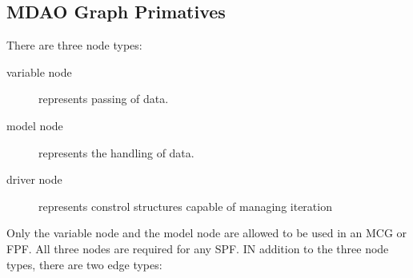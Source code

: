 
\subsection{MDAO Graph Primatives}
There are three node types:  
\begin{description}
\item[variable node] represents passing of data.
\item[model node] represents the handling of data.
\item[driver node] represents constrol structures capable of managing iteration
\end{description}

Only the variable node and the model node are allowed to be used in an MCG or FPF. 
All three nodes are required for any SPF. IN addition to the three node types, there 
are two edge types: 

